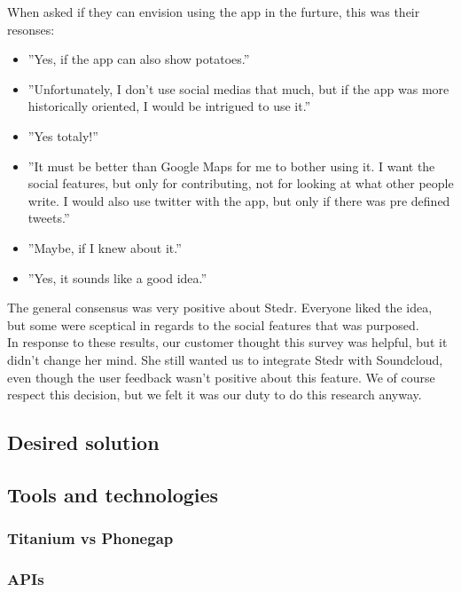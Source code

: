 	When asked if they can envision using the app in the furture, this was their resonses:
\begin{itemize}
	\item ”Yes, if the app can also show potatoes.”
	\item ”Unfortunately, I don't use social medias that much, but if the app was more historically oriented, I would be intrigued to use it.”
	\item ”Yes totaly!”
	\item ”It must be better than Google Maps for me to bother using it. I want the social features, but only for contributing, not for looking at what other people write. I would also use twitter with the app, but only if there was pre defined tweets.”
	\item”Maybe, if I knew about it.”
	\item ”Yes, it sounds like a good idea.”
\end{itemize}

	The general consensus was very positive about Stedr. Everyone liked the idea, but some were sceptical in regards to the social features that was purposed.\\

	In response to these results, our customer thought this survey was helpful, but it didn't change her mind. She still wanted us to integrate Stedr with Soundcloud, even though the user feedback wasn't positive about this feature. We of course respect this decision, but we felt it was our duty to do this research anyway.
	
	\subsection{Desired solution}
	
	
	\subsection{Tools and technologies}
		\subsubsection{Titanium vs Phonegap}
		\subsubsection{APIs}
		
